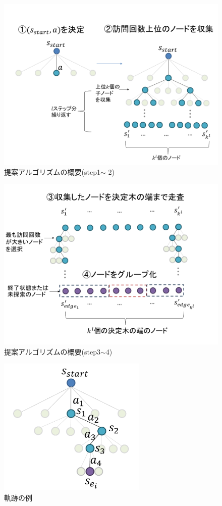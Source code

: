 \begin{figure}[htbp]
    \centering
    \includegraphics[width=\linewidth]{./figure/1-2.png}
    \caption{提案アルゴリズムの概要(step1$\sim$ 2)}
    \label{fig:step1-2}
\end{figure}
\begin{figure}[htbp]
    \centering
    \includegraphics[width=\linewidth]{./figure/3-4.png}
    \caption{提案アルゴリズムの概要(step3$\sim $4)}
    \label{fig:step3-4}
\end{figure}
\begin{figure}[htbp]
    \centering
    \includegraphics[width=200pt]{./figure/traj-example.png}
    \caption{軌跡の例}
    \label{fig:traj-example}
\end{figure}
